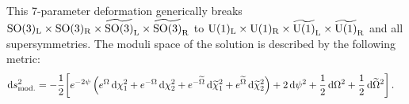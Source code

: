 \documentclass[a4paper, 11pt]{article}
\numberwithin{equation}{section}
\newcommand{\ts}[1]{\widetilde{#1}}
\newcommand{\SO}[1]{\mathrm{SO}( #1 )}
\newcommand{\+}{\oplus}
\renewcommand{\d}{\ensuremath{\mathrm{d}}\xspace}
\begin{document}
This 7-parameter deformation generically breaks $\SO{3}_{\rm L}\times\SO{3}_{\rm R}\times\ts{\SO{3}}_{\rm L}\times\ts{\SO{3}}_{\rm R}$ to ${\rm U}(1)_{\rm L}\times{\rm U}(1)_{\rm R}\times\ts{{\rm U}(1)}_{\rm L}\times\ts{{\rm U}(1)}_{\rm R}$ and all supersymmetries. The moduli space of the solution is described by the following metric:
\begin{equation} \label{eq:Zam7Param}
	\begin{aligned}
		\d s^{2}_{\rm mod.} &= -\frac{1}{2}\bigg[e^{-2\psi}\left(e^{\Omega}\,\d\chi_{1}^{2}+e^{-\Omega}\,\d\chi_{2}^{2}+e^{-\ts{\Omega}}\,\d\ts{\chi}_{1}^{2}+e^{\ts{\Omega}}\,\d\ts{\chi}_{2}^{2}\right) +2\,\d\psi^{2} + \frac{1}{2}\,\d\Omega^{2}+ \frac{1}{2}\,\d\ts{\Omega}^{2}\bigg] \,.
	\end{aligned}
\end{equation}
\end{document}
